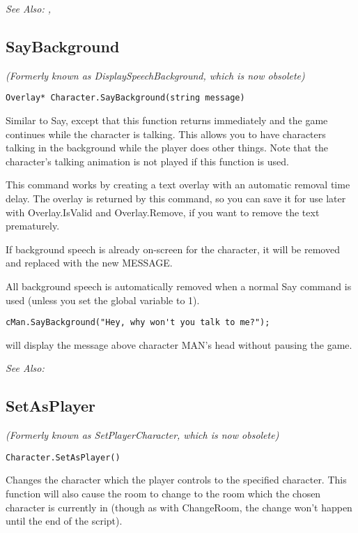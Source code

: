 \it{See Also:} ,


\subsection{SayBackground}\label{Character.SayBackground}%

\it{(Formerly known as DisplaySpeechBackground, which is now obsolete)}

\begin{verbatim}
Overlay* Character.SayBackground(string message)
\end{verbatim}
Similar to Say, except that this function returns immediately
and the game continues while the character is talking. This allows you
to have characters talking in the background while the player does other
things. Note that the character's talking animation is not played if this
function is used.

This command works by creating a text overlay with an automatic removal time
delay. The overlay is returned by this command, so you can save it for
use later with Overlay.IsValid and Overlay.Remove, if you want to remove the
text prematurely.

If background speech is already on-screen for the character, it will be removed and
replaced with the new MESSAGE.

All background speech is automatically removed when a normal Say command
is used (unless you set the global variable  to 1).

\begin{verbatim}
cMan.SayBackground("Hey, why won't you talk to me?");
\end{verbatim}
will display the message above character MAN's head without pausing the game.

\it{See Also:} 


\subsection{SetAsPlayer}\label{Character.SetAsPlayer}%

\it{(Formerly known as SetPlayerCharacter, which is now obsolete)}

\begin{verbatim}
Character.SetAsPlayer()
\end{verbatim}
Changes the character which the player controls to the specified character.
This function will also cause the room to change to the room which the
chosen character is currently in (though as with ChangeRoom, the change won't
happen until the end of the script).


